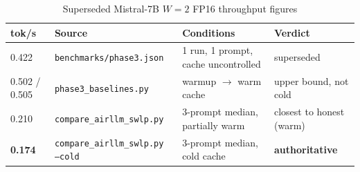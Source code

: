 \documentclass[10pt,a4paper]{article}
\begin{document}
\begin{table}[htbp]
\centering
\caption{Superseded Mistral-7B $W=2$ FP16 throughput figures}
\label{tab:superseded}
\footnotesize
\begin{tabular}{@{}llll@{}}
\toprule
\textbf{tok/s} & \textbf{Source} & \textbf{Conditions} & \textbf{Verdict} \\
\midrule
0.422 & \texttt{benchmarks/phase3.json} & 1 run, 1 prompt, cache uncontrolled & superseded \\
0.502 / 0.505 & \texttt{phase3\_baselines.py} & warmup $\rightarrow$ warm cache & upper bound, not cold \\
0.210 & \texttt{compare\_airllm\_swlp.py} & 3-prompt median, partially warm & closest to honest (warm) \\
\midrule
\textbf{0.174} & \texttt{compare\_airllm\_swlp.py --cold} & 3-prompt median, cold cache & \textbf{authoritative} \\
\bottomrule
\end{tabular}
\end{table}
\end{document}
